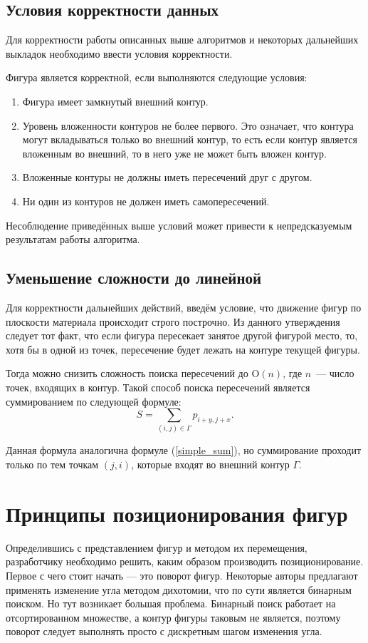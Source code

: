 \documentclass[14pt]{extarticle}
\begin{document}
	\subsection{Условия корректности данных}
	Для корректности работы описанных выше алгоритмов и некоторых дальнейших выкладок необходимо ввести условия корректности.


	Фигура является корректной, если выполняются следующие условия:
	\begin{enumerate}
		\item Фигура имеет замкнутый внешний контур.
		\item Уровень вложенности контуров не более первого. Это означает, что контура могут вкладываться только во внешний контур, то есть если контур является вложенным во внешний, то в него уже не может быть вложен контур.
		\item Вложенные контуры не должны иметь пересечений друг с другом.
		\item Ни один из контуров не должен иметь самопересечений.
	\end{enumerate} 


	Несоблюдение приведённых выше условий может привести к непредсказуемым результатам работы алгоритма.
	\subsection{Уменьшение сложности до линейной}
	Для корректности дальнейших действий, введём условие, что движение фигур по плоскости материала происходит строго построчно. Из данного утверждения следует тот факт, что если фигура пересекает занятое другой фигурой место, то, хотя бы в одной из точек, пересечение будет лежать на контуре текущей фигуры.


	Тогда можно снизить сложность поиска пересечений до $\mathrm{O}(n)$, где $n$~--- число точек, входящих в контур. Такой способ поиска пересечений является суммированием по следующей формуле:
	\begin{equation}
		S=\sum_{(i,j)\in\Gamma}p_{i+y,j+x}.
	\end{equation}


	Данная формула аналогична формуле (\ref{simple_sum}),  но суммирование проходит только по тем точкам $(j, i)$, которые входят во внешний контур $\Gamma$.
	\section{Принципы позиционирования фигур}
	Определившись с представлением фигур и методом их перемещения, разработчику необходимо решить, каким образом производить позиционирование. Первое с чего стоит начать --- это поворот фигур. Некоторые авторы предлагают применять изменение угла методом дихотомии, что по сути является бинарным поиском. Но тут возникает большая проблема. Бинарный поиск работает на отсортированном множестве, а контур фигуры таковым не является, поэтому поворот следует выполнять просто с дискретным шагом изменения угла.
\end{document}
